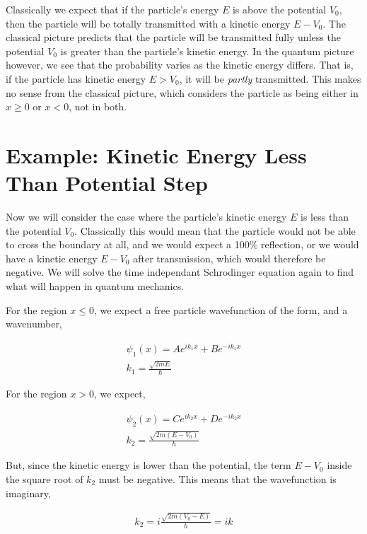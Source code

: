 \documentclass[11pt]{amsart}
\begin{document}
Classically we expect that if the particle's energy $E$ is above the potential $V_0$, then the particle will be totally transmitted with a kinetic energy $E - V_0$. The classical picture predicts that the particle will be transmitted fully unless the potential $V_0$ is greater than the particle's kinetic energy. In the quantum picture however, we see that the probability varies as the kinetic energy differs. That is, if the particle has kinetic energy $E > V_0$, it will be \textit{partly} transmitted. This makes no sense from the classical picture, which considers the particle as being either in $x \geq 0$ or $x < 0$, not in both.

\section{Example: Kinetic Energy Less Than Potential Step}

Now we will consider the case where the particle's kinetic energy $E$ is less than the potential $V_0$. Classically this would mean that the particle would not be able to cross the boundary at all, and we would expect a 100\% reflection, or we would have a kinetic energy $E - V_0$ after transmission, which would therefore be negative. We will solve the time independant Schrodinger equation again to find what will happen in quantum mechanics.

For the region $x \leq 0$, we expect a free particle wavefunction of the form, and a wavenumber,

\begin{align*}
  \psi_1(x) = A e^{i k_1 x} + B e^{-i k_1 x} \\
  k_1 = \frac{\sqrt{2mE}}{\hbar}
\end{align*}

For the region $x > 0$, we expect,

\begin{align*}
  \psi_2(x) = C e^{i k_2 x} + D e^{-i k_2 x} \\
  k_2 = \frac{\sqrt{2m\left(E - V_0\right)}}{\hbar}
\end{align*}

But, since the kinetic energy is lower than the potential, the term $E - V_0$ inside the square root of $k_2$ must be negative. This means that the wavefunction is imaginary,

\begin{align*}
  k_2 = i \frac{\sqrt{2m\left(V_0 - E\right)}}{\hbar} = ik
\end{align*}
\end{document}
